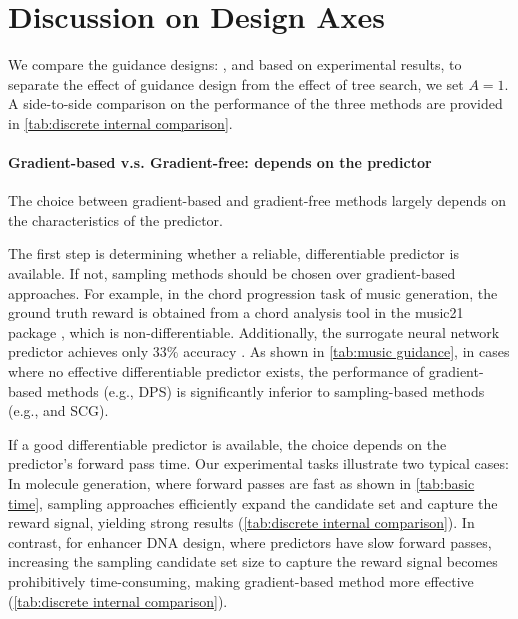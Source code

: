 \section{Discussion on Design Axes} \label{app: exp discuss guidance design}
We compare the guidance designs: \xtsampling, \xcleansampling and \xtgrad based on experimental results, to separate the effect of guidance design from the effect of tree search, we set $A=1$. A side-to-side comparison on the performance of the three methods are provided in \cref{tab:discrete internal comparison}.








\paragraph{Gradient-based v.s. Gradient-free: depends on the predictor} The choice between gradient-based and gradient-free methods largely depends on the characteristics of the predictor. 

The first step is determining whether a reliable, differentiable predictor is available. If not, sampling methods should be chosen over gradient-based approaches. For example, in the chord progression task of music generation, the ground truth reward is obtained from a chord analysis tool in the music21 package \cite{cuthbert2010music21}, which is non-differentiable. Additionally, the surrogate neural network predictor achieves only $33\%$ accuracy \cite{huang2024symbolic}. As shown in \cref{tab:music guidance}, in cases where no effective differentiable predictor exists, the performance of gradient-based methods (e.g., DPS) is significantly inferior to sampling-based methods (e.g., \xcleansampling and SCG).


If a good differentiable predictor is available, the choice depends on the predictor's forward pass time. Our experimental tasks illustrate two typical cases: In molecule generation, where forward passes are fast as shown in \cref{tab:basic time}, sampling approaches efficiently expand the candidate set and capture the reward signal, yielding strong results (\cref{tab:discrete internal comparison}). In contrast, for enhancer DNA design, where predictors have slow forward passes, increasing the sampling candidate set size to capture the reward signal becomes prohibitively time-consuming, making gradient-based method more effective (\cref{tab:discrete internal comparison}).

